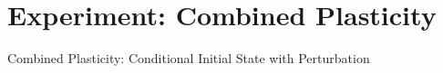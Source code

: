 \section{Experiment: Combined Plasticity}

\begin{frame}{Combined Plasticity: Conditional Initial State with Perturbation}

\end{frame}
